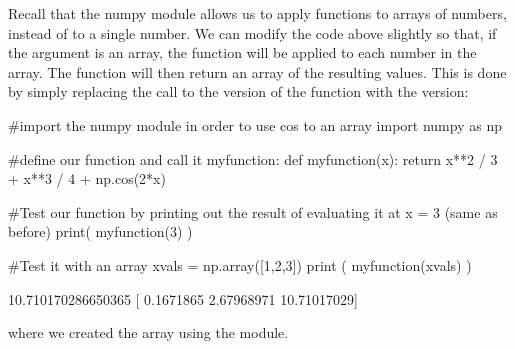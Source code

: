 Recall that the numpy module allows us to apply functions to arrays of numbers, instead of to a single number. We can modify the code above slightly so that, if the argument  is an array, the function will be applied to each number in the array. The function will then return an array of the resulting values. This is done by simply replacing the call to the  version of the  function with the  version:
\begin{python}[caption=Defining a function that works on an array] 
#import the numpy module in order to use cos to an array
import numpy as np

#define our function and call it myfunction:
def myfunction(x):
  return x**2 / 3 + x**3 / 4 + np.cos(2*x)
  
#Test our function by printing out the result of evaluating it at x = 3 (same as before)
print( myfunction(3) )  

#Test it with an array
xvals = np.array([1,2,3])
print ( myfunction(xvals) )  

\end{python}
\begin{poutput}
10.710170286650365
[ 0.1671865   2.67968971 10.71017029]
\end{poutput}
where we created the array  using the  module.

